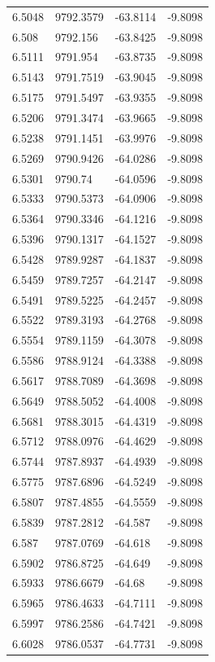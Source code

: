 \begin{table}[H]
\begin{tabular}{llll}
6.5048 & 9792.3579 & -63.8114 & -9.8098 \\
6.508 & 9792.156 & -63.8425 & -9.8098 \\
6.5111 & 9791.954 & -63.8735 & -9.8098 \\
6.5143 & 9791.7519 & -63.9045 & -9.8098 \\
6.5175 & 9791.5497 & -63.9355 & -9.8098 \\
6.5206 & 9791.3474 & -63.9665 & -9.8098 \\
6.5238 & 9791.1451 & -63.9976 & -9.8098 \\
6.5269 & 9790.9426 & -64.0286 & -9.8098 \\
6.5301 & 9790.74 & -64.0596 & -9.8098 \\
6.5333 & 9790.5373 & -64.0906 & -9.8098 \\
6.5364 & 9790.3346 & -64.1216 & -9.8098 \\
6.5396 & 9790.1317 & -64.1527 & -9.8098 \\
6.5428 & 9789.9287 & -64.1837 & -9.8098 \\
6.5459 & 9789.7257 & -64.2147 & -9.8098 \\
6.5491 & 9789.5225 & -64.2457 & -9.8098 \\
6.5522 & 9789.3193 & -64.2768 & -9.8098 \\
6.5554 & 9789.1159 & -64.3078 & -9.8098 \\
6.5586 & 9788.9124 & -64.3388 & -9.8098 \\
6.5617 & 9788.7089 & -64.3698 & -9.8098 \\
6.5649 & 9788.5052 & -64.4008 & -9.8098 \\
6.5681 & 9788.3015 & -64.4319 & -9.8098 \\
6.5712 & 9788.0976 & -64.4629 & -9.8098 \\
6.5744 & 9787.8937 & -64.4939 & -9.8098 \\
6.5775 & 9787.6896 & -64.5249 & -9.8098 \\
6.5807 & 9787.4855 & -64.5559 & -9.8098 \\
6.5839 & 9787.2812 & -64.587 & -9.8098 \\
6.587 & 9787.0769 & -64.618 & -9.8098 \\
6.5902 & 9786.8725 & -64.649 & -9.8098 \\
6.5933 & 9786.6679 & -64.68 & -9.8098 \\
6.5965 & 9786.4633 & -64.7111 & -9.8098 \\
6.5997 & 9786.2586 & -64.7421 & -9.8098 \\
6.6028 & 9786.0537 & -64.7731 & -9.8098 \\

\end{tabular}
\end{table}
